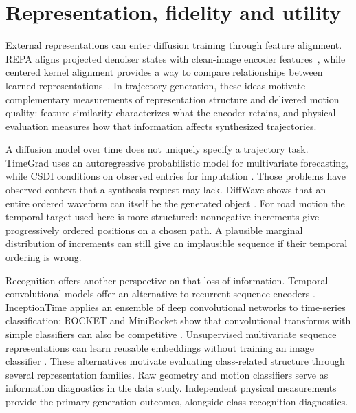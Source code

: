 \section{Representation, fidelity and utility}
External representations can enter diffusion training through feature alignment. REPA aligns projected denoiser states with clean-image encoder features~\cite{repa}, while centered kernel alignment provides a way to compare relationships between learned representations~\cite{kornblith2019}. In trajectory generation, these ideas motivate complementary measurements of representation structure and delivered motion quality: feature similarity characterizes what the encoder retains, and physical evaluation measures how that information affects synthesized trajectories.

A diffusion model over time does not uniquely specify a trajectory task. TimeGrad uses an autoregressive probabilistic model for multivariate forecasting, while CSDI conditions on observed entries for imputation \cite{timegrad,csdi}. Those problems have observed context that a synthesis request may lack. DiffWave shows that an entire ordered waveform can itself be the generated object \cite{diffwave}. For road motion the temporal target used here is more structured: nonnegative increments give progressively ordered positions on a chosen path. A plausible marginal distribution of increments can still give an implausible sequence if their temporal ordering is wrong.

Recognition offers another perspective on that loss of information. Temporal convolutional models offer an alternative to recurrent sequence encoders \cite{tcn,gru}. InceptionTime applies an ensemble of deep convolutional networks to time-series classification; ROCKET and MiniRocket show that convolutional transforms with simple classifiers can also be competitive \cite{inception,rocket,minirocket}. Unsupervised multivariate sequence representations can learn reusable embeddings without training an image classifier \cite{mtst}. These alternatives motivate evaluating class-related structure through several representation families. Raw geometry and motion classifiers serve as information diagnostics in the data study. Independent physical measurements provide the primary generation outcomes, alongside class-recognition diagnostics.


